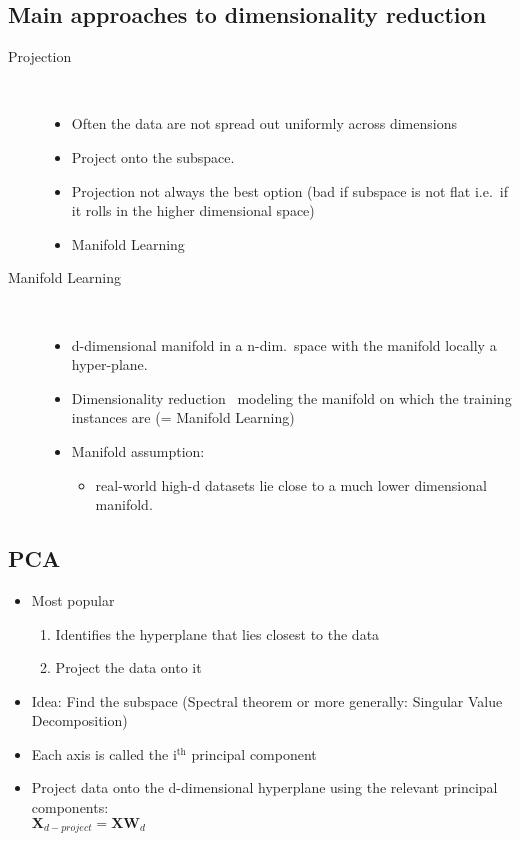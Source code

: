 \subsection{Main approaches to dimensionality reduction}
\begin{description}
    \item[Projection] \hfill\\
        \begin{itemize}
            \item Often the data are not spread out uniformly across dimensions
            \item[\arrow] Project onto the subspace.
            \item Projection not always the best option (bad if subspace is not flat i.e.\ if it rolls in the higher
                dimensional space)
            \item[\Arrow] Manifold Learning
        \end{itemize}

    \item[Manifold Learning] \hfill\\
        \begin{itemize}
            \item d-dimensional manifold in a n-dim.\ space with the manifold locally a hyper-plane.
            \item Dimensionality reduction \arrow\ modeling the manifold on which the training instances are (= Manifold
                Learning)
            \item Manifold assumption:
                \begin{itemize}
                    \item real-world high-d datasets lie close to a much lower dimensional manifold.
                \end{itemize}
        \end{itemize}
\end{description}

\subsection{PCA}
\begin{itemize}
    \item Most popular
    \begin{enumerate}
        \item Identifies the hyperplane that lies closest to the data
        \item Project the data onto it
    \end{enumerate}
    \item Idea: Find the subspace (Spectral theorem or more generally: Singular Value Decomposition)
    \item Each axis is called the i$^\mathrm{th}$ principal component
    \item Project data onto the d-dimensional hyperplane using the relevant principal components:\\
        $\mathbf{X}_{d-project} = \mathbf{X} \mathbf{W}_d$
\end{itemize}


